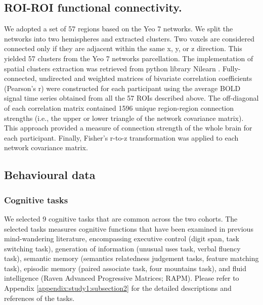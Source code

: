 \subsection{ROI-ROI functional connectivity.}
\label{study3:method:d}
We adopted a set of 57 regions based on the Yeo 7 networks. We split the networks into two hemispheres and extracted clusters. Two voxels are considered connected only if they are adjacent within the same x, y, or z direction. This yielded 57 clusters from the Yeo 7 networks parcellation. The implementation of spatial clusters extraction was retrieved from python library Nilearn
\cite[ \url{http://nilearn.github.io/}, version 0.3.1]{Abraham2014}.
Fully-connected, undirected and weighted matrices of bivariate correlation coefficients (Pearson's r) were constructed for each participant using the average BOLD signal time series obtained from all the 57 ROIs described above. The off-diagonal of each correlation matrix contained 1596 unique region-region connection strengths (i.e., the upper or lower triangle of the network covariance matrix). This approach provided a measure of connection strength of the whole brain for each participant. Finally, Fisher’s r-to-z transformation was applied to each network covariance matrix.

\subsection{Behavioural data}
\label{study3:method:e}

\subsubsection{Cognitive tasks}
\label{study3:method:e:cog}
We selected 9 cognitive tasks that are common across the two cohorts. The selected tasks measures cognitive functions that have been examined in previous mind-wandering literature, encompassing executive control (digit span, task switching task), generation of information (unusual uses task, verbal fluency task), semantic memory (semantics relatedness judgement tasks, feature matching task), episodic memory (paired associate task, four mountains task), and fluid intelligence (Raven Advanced Progressive Matrices; RAPM). Please refer to Appendix \ref{appendix:study1:subsection2} for the detailed descriptions and references of the tasks.

